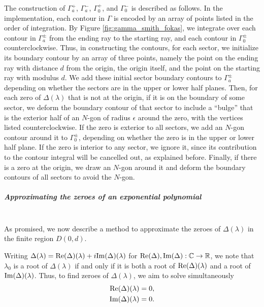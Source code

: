 \documentclass[11pt, oneside, a4paper]{article}
\begin{document}
The construction of $\Gamma_a^+$, $\Gamma_a^-$, $\Gamma_0^+$, and $\Gamma_0^-$ is described as follows. In the implementation, each contour in $\Gamma$ is encoded by an array of points listed in the order of integration. By Figure \ref{fig:gamma_smith_fokas}, we integrate over each contour in $\Gamma_a^\pm$ from the ending ray to the starting ray, and each contour in $\Gamma_0^\pm$ counterclockwise. Thus, in constructing the contours, for each sector, we initialize its boundary contour by an array of three points, namely the point on the ending ray with distance $d$ from the origin, the origin itself, and the point on the starting ray with modulus $d$. We add these initial sector boundary contours to $\Gamma_a^\pm$ depending on whether the sectors are in the upper or lower half planes. Then, for each zero of $\Delta(\lambda)$ that is not at the origin, if it is on the boundary of some sector, we deform the boundary contour of that sector to include a ``bulge'' that is the exterior half of an $N$-gon of radius $\epsilon$ around the zero, with the vertices listed counterclockwise. If the zero is exterior to all sectors, we add an $N$-gon contour around it to $\Gamma_0^{\pm}$, depending on whether the zero is in the upper or lower half plane. If the zero is interior to any sector, we ignore it, since its contribution to the contour integral will be cancelled out, as explained before. Finally, if there is a zero at the origin, we draw an $N$-gon around it and deform the boundary contours of all sectors to avoid the $N$-gon. 

\noindent\subparagraph{Approximating the zeroes of an exponential polynomial}\mbox{}\\
As promised, we now describe a method to approximate the zeroes of $\Delta(\lambda)$ in the finite region $D(0,d)$.

Writing $\Delta(\lambda)=\mathrm{Re}(\Delta)(\lambda) + i\mathrm{Im}(\Delta)(\lambda)$ for $\mathrm{Re}(\Delta), \mathrm{Im}(\Delta): \mathbb C\to\mathbb R$, we note that $\lambda_0$ is a root of $\Delta(\lambda)$ if and only if it is both a root of $\mathrm{Re}(\Delta)(\lambda)$ and a root of $\mathrm{Im}(\Delta)(\lambda)$. Thus, to find zeroes of $\Delta(\lambda)$, we aim to solve simultaneously
\begin{subequations}\label{eq:delta_real_imaginary}
    \begin{align}
        \mathrm{Re}(\Delta)(\lambda) &= 0,\\
        \mathrm{Im}(\Delta)(\lambda) &= 0.
    \end{align}
\end{subequations}
\end{document}
